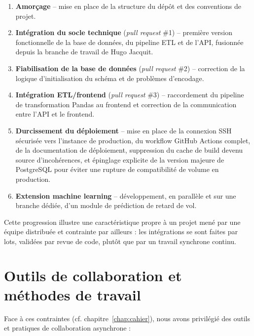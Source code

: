 \documentclass[11pt,a4paper]{report}
\begin{document}
\begin{enumerate}
  \item \textbf{Amorçage} -- mise en place de la structure du dépôt et des conventions de projet.
  \item \textbf{Intégration du socle technique} (\emph{pull request} \#1) -- première version fonctionnelle de la base de données, du pipeline ETL et de l'API, fusionnée depuis la branche de travail de Hugo Jacquit.
  \item \textbf{Fiabilisation de la base de données} (\emph{pull request} \#2) -- correction de la logique d'initialisation du schéma et de problèmes d'encodage.
  \item \textbf{Intégration ETL/frontend} (\emph{pull request} \#3) -- raccordement du pipeline de transformation Pandas au frontend et correction de la communication entre l'API et le frontend.
  \item \textbf{Durcissement du déploiement} -- mise en place de la connexion SSH sécurisée vers l'instance de production, du workflow GitHub Actions complet, de la documentation de déploiement, suppression du cache de build devenu source d'incohérences, et épinglage explicite de la version majeure de PostgreSQL pour éviter une rupture de compatibilité de volume en production.
  \item \textbf{Extension machine learning} -- développement, en parallèle et sur une branche dédiée, d'un module de prédiction de retard de vol.
\end{enumerate}

Cette progression illustre une caractéristique propre à un projet mené par une équipe distribuée et contrainte par ailleurs : les intégrations se sont faites par lots, validées par revue de code, plutôt que par un travail synchrone continu.

\section{Outils de collaboration et méthodes de travail}

Face à ces contraintes (cf. chapitre~\ref{chap:cahier}), nous avons privilégié des outils et pratiques de collaboration asynchrone :
\end{document}
